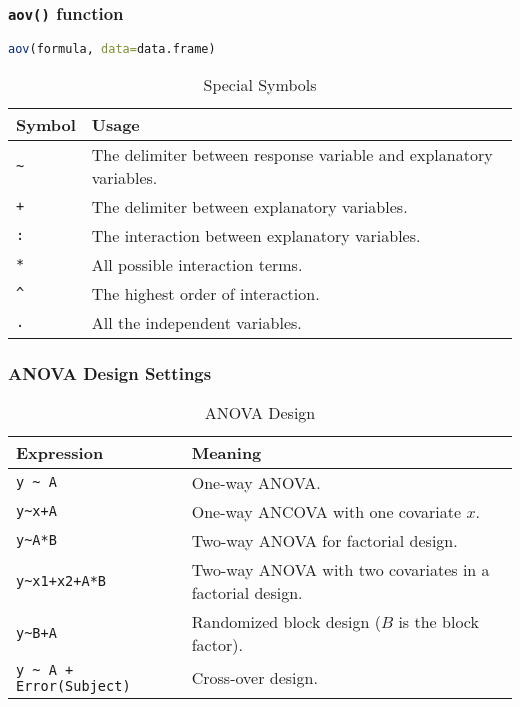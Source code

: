 \documentclass[table,10pt]{beamer}\usepackage[]{graphicx}\usepackage[]{color}
\begin{document}
\begin{CJK*}{UTF8}{gbsn}
\begin{frame}[t,containsverbatim]
\frametitle{\texttt{aov()} function}
\begin{lstlisting}[language=R]
aov(formula, data=data.frame)
\end{lstlisting}

\begin{table}
\caption{Special Symbols}
\small
\begin{tabular}{p{}p{}}
Symbol	&	Usage\\
\hline
\verb|~| & The delimiter between response variable and explanatory variables. \\
\verb|+| & The delimiter between explanatory variables.\\
\verb|:| & The interaction between explanatory variables.\\
\verb|*| & All possible interaction terms.\\
\verb|^| & The highest order of interaction.\\
\verb|.| & All the independent variables.\\
\hline
\end{tabular}
\end{table}
\end{frame}


\begin{frame}[t,containsverbatim]
\frametitle{ANOVA Design Settings}
\begin{table}
\caption{ANOVA Design}
\begin{tabular}{p{}p{}}
\hline
Expression	&	Meaning\\
\hline
\verb#y ~ A# & One-way ANOVA. \\
\verb#y~x+A# & One-way ANCOVA with one covariate $x$.\\
\verb#y~A*B# & Two-way ANOVA for factorial design.\\
\verb#y~x1+x2+A*B# & Two-way ANOVA with two covariates in a factorial design.\\
\verb#y~B+A# & Randomized block design ($B$ is the block factor).\\
\verb#y ~ A + Error(Subject)# & Cross-over design.\\
\hline
\end{tabular}
\end{table}
\end{frame}



\end{CJK*}
\end{document}
